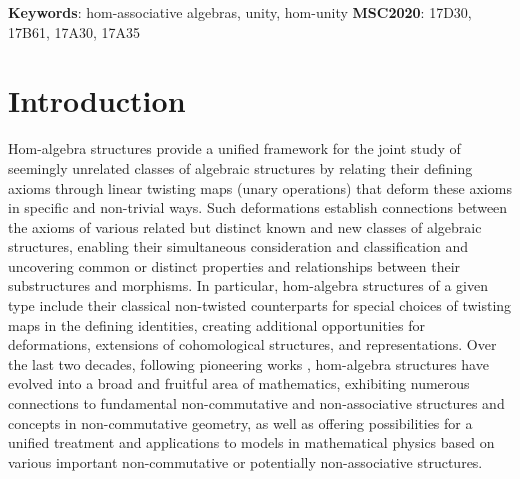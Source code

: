 \documentclass[12pt]{article}
\begin{document}
		\noindent
		\textbf{Keywords}: hom-associative algebras, unity, hom-unity \newline
		\noindent
		\textbf{MSC2020}: 17D30, 17B61, 17A30, 17A35
		
		
		\tableofcontents
		
		
		\section{Introduction}
		Hom-algebra structures provide a unified framework for the joint study of seemingly unrelated classes of algebraic structures by relating their defining axioms through linear twisting maps (unary operations) that deform these axioms in specific and non-trivial ways. Such deformations establish connections between the axioms of various related but distinct known and new classes of algebraic structures, enabling their simultaneous consideration and classification and uncovering common or distinct properties and relationships between their substructures and morphisms. In particular, hom-algebra structures of a given type include their classical non-twisted counterparts for special choices of twisting maps in the defining identities, creating additional opportunities for deformations, extensions of cohomological structures, and representations.
		Over the last two decades, following pioneering works \cite{Hartwig-Larsson-Silvestrov,LarssonSilvJA2005:QuasiHomLieCentExt2cocyid,Larsson-Silvestrov-QuasiLiealg,LSGradedquasiLiealg,LarssonSilvestrov-quasidefal2twderiv,ms:homstructure,MakSil-formaldefs}, hom-algebra structures have evolved into a broad and fruitful area of mathematics, exhibiting numerous connections to fundamental non-commutative and non-associative structures and concepts in non-commutative geometry, as well as offering possibilities for a unified treatment and applications to models in mathematical physics based on various important non-commutative or potentially non-associative structures.
		
\end{document}
